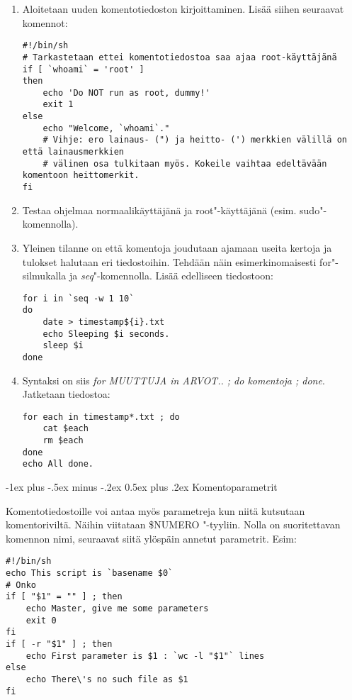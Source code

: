 \documentclass[12pt,portrait,a4]{article}
\makeatletter
\renewcommand{\section}{\@startsection{section}{1}{0mm}%
                                {-1ex plus -.5ex minus -.2ex}%
                                {0.5ex plus .2ex}%
                                {\normalfont\large\bfseries}}
\makeatother
\begin{document}
\begin{enumerate}
\item Aloitetaan uuden komentotiedoston kirjoittaminen.  Lisää siihen
seuraavat komennot:
\begin{verbatim}
#!/bin/sh
# Tarkastetaan ettei komentotiedostoa saa ajaa root-käyttäjänä
if [ `whoami` = 'root' ]
then
    echo 'Do NOT run as root, dummy!'
    exit 1
else
    echo "Welcome, `whoami`."
    # Vihje: ero lainaus- (") ja heitto- (') merkkien välillä on että lainausmerkkien
    # välinen osa tulkitaan myös. Kokeile vaihtaa edeltävään komentoon heittomerkit.
fi
\end{verbatim}
\item Testaa ohjelmaa normaalikäyttäjänä ja root"-käyttäjänä (esim.
sudo"-komennolla).
\item Yleinen tilanne on että komentoja joudutaan ajamaan useita kertoja ja
tulokset halutaan eri tiedostoihin.  Tehdään näin esimerkinomaisesti
for"-silmukalla ja \emph{seq}"-komennolla.  Lisää edelliseen tiedostoon:
\begin{verbatim}
for i in `seq -w 1 10`
do
    date > timestamp${i}.txt
    echo Sleeping $i seconds.
    sleep $i
done
\end{verbatim}
\item Syntaksi on siis \emph{for MUUTTUJA in ARVOT.. ; do komentoja ; done}.
Jatketaan tiedostoa:
\begin{verbatim}
for each in timestamp*.txt ; do
    cat $each
    rm $each
done
echo All done.
\end{verbatim}

\end{enumerate}

\section{Komentoparametrit}

Komentotiedostoille voi antaa myös parametreja kun niitä kutsutaan
komentoriviltä.  Näihin viitataan \$NUMERO "-tyyliin.  Nolla on
suoritettavan komennon nimi, seuraavat siitä ylöspäin annetut parametrit. 
Esim:

\begin{verbatim}
#!/bin/sh
echo This script is `basename $0`
# Onko 
if [ "$1" = "" ] ; then
    echo Master, give me some parameters
    exit 0
fi
if [ -r "$1" ] ; then
    echo First parameter is $1 : `wc -l "$1"` lines
else
    echo There\'s no such file as $1
fi
\end{verbatim}
\end{document}
